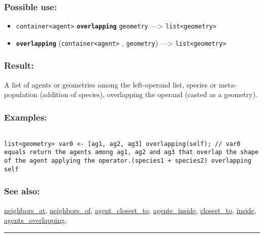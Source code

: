 \documentclass[]{book}
\providecommand{\tightlist}{%
  \setlength{\itemsep}{0pt}\setlength{\parskip}{0pt}}
\theoremstyle{definition}
\theoremstyle{definition}
\theoremstyle{definition}
\theoremstyle{remark}
\begin{document}
\subsubsection{Possible use:}\label{possible-use-390}

\begin{itemize}
\tightlist
\item
  \texttt{container\textless{}agent\textgreater{}}
  \textbf{\texttt{overlapping}} \texttt{geometry} ---\textgreater{}
  \texttt{list\textless{}geometry\textgreater{}}
\item
  \textbf{\texttt{overlapping}}
  (\texttt{container\textless{}agent\textgreater{}} , \texttt{geometry})
  ---\textgreater{} \texttt{list\textless{}geometry\textgreater{}}
\end{itemize}

\subsubsection{Result:}\label{result-376}

A list of agents or geometries among the left-operand list, species or
meta-population (addition of species), overlapping the operand (casted
as a geometry).

\subsubsection{Examples:}\label{examples-268}

\begin{verbatim}
 
list<geometry> var0 <- [ag1, ag2, ag3] overlapping(self); // var0 equals return the agents among ag1, ag2 and ag3 that overlap the shape of the agent applying the operator.(species1 + species2) overlapping self 
\end{verbatim}

\subsubsection{See also:}\label{see-also-156}

\href{OperatorsNR\#neighbors_at}{neighbors\_at},
\href{OperatorsNR\#neighbors_of}{neighbors\_of},
\href{OperatorsAA\#agent_closest_to}{agent\_closest\_to},
\href{OperatorsAA\#agents_inside}{agents\_inside},
\href{OperatorsBC\#closest_to}{closest\_to},
\href{OperatorsIM\#inside}{inside},
\href{OperatorsAA\#agents_overlapping}{agents\_overlapping},

\begin{center}\rule{0.5\linewidth}{\linethickness}\end{center}
\end{document}
